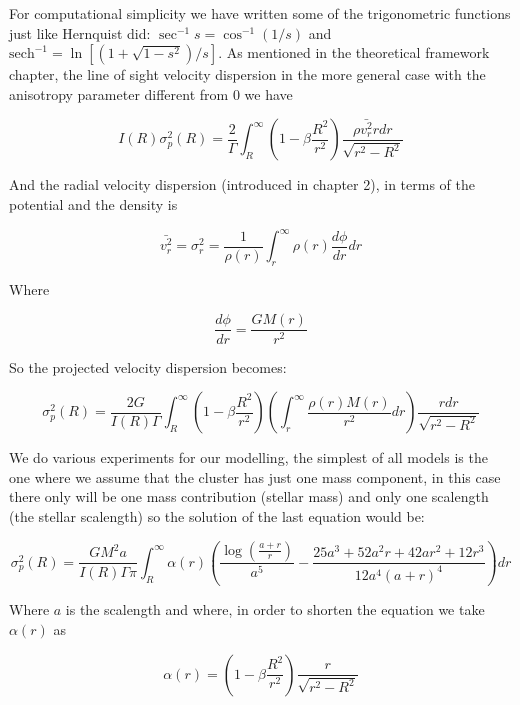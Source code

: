 For computational simplicity we have written some of the trigonometric functions just like Hernquist did: $\sec^{-1}s = \cos^{-1}(1/s)$ and $\text{sech}^{-1} = \ln[(1+\sqrt{1-s^{2}})/s]$. As mentioned in the theoretical framework chapter, the line of sight velocity dispersion in the more general case with the anisotropy parameter different from 0 we have

\begin{equation}
I(R)\sigma_{p}^{2}(R)=\frac{2}{\Gamma}\int_{R}^{\infty}\left(1-\beta\frac{R^{2}}{r^{2}}\right)\frac{\rho\bar{v_{r}^{2}}rdr}{\sqrt{r^{2}-R^{2}}}
\end{equation}

And the radial velocity dispersion (introduced in chapter 2), in terms of the potential and the density is

\begin{equation}
\bar{v_{r}^{2}}=\sigma_{r}^{2}=\frac{1}{\rho(r)}\int_{r}^{\infty}\rho(r)\frac{d\phi}{dr}dr
\end{equation}

Where 

\begin{equation}
\frac{d\phi}{dr}=\frac{GM(r)}{r^{2}}
\end{equation}

So the projected velocity dispersion becomes:

\begin{equation}
\sigma_{p}^{2}(R)=\frac{2G}{I(R)\Gamma}\int_{R}^{\infty}\left(1-\beta\frac{R^{2}}{r^{2}}\right)\left(\int_{r}^{\infty}\frac{\rho(r)M(r)}{r^{2}}dr\right)\frac{rdr}{\sqrt{r^{2}-R^{2}}}
\end{equation}

We do various experiments for our modelling, the simplest of all models is the one where we assume that the cluster has just one mass component, in this case there only will be one mass contribution (stellar mass) and only one scalength (the stellar scalength) so the solution of the last equation would be:

\begin{equation}
\sigma_{p}^{2}(R)=\frac{GM^{2}a}{I(R)\Gamma\pi}\int_{R}^{\infty}\alpha(r)\left(\frac{\log{\left(\frac{a+r}{r}\right)}}{a^{5}}-\frac{25a^{3}+52a^{2}r+42ar^{2}+12r^{3}}{12a^{4}\left(a+r\right)^{4}}\right)dr
\end{equation}

Where $a$ is the scalength and where, in order to shorten the equation we take $\alpha(r)$ as 

\begin{equation}
\alpha(r)=\left(1-\beta\frac{R^{2}}{r^{2}}\right)\frac{r}{\sqrt{r^{2}-R^{2}}}
\end{equation}

